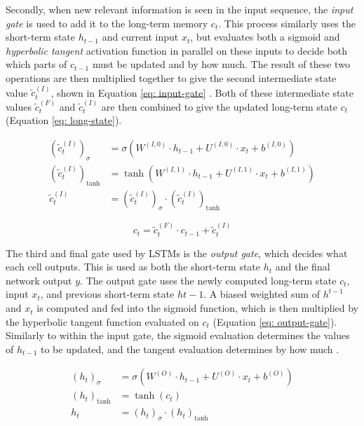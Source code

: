 \documentclass[a4paper, 11pt]{report}
\begin{document}
    Secondly, when new relevant information is seen in the input sequence, the \emph{input gate} is used to add it to the long-term memory $c_t$. This process similarly uses the short-term state $h_{t-1}$ and current input $x_t$, but evaluates both a sigmoid and \emph{hyperbolic tangent} activation function in parallel on these inputs to decide both which parts of $c_{t-1}$ must be updated and by how much. The result of these two operations are then multiplied together to give the second intermediate state value $\tilde{c}^{(I)}_t$, shown in Equation \ref{eq: input-gate} \citep{zhang-2021}. Both of these intermediate state values $\tilde{c}^{(F)}_t$ and $\tilde{c}^{(I)}_t$ are then combined to give the updated long-term state $c_t$ (Equation \ref{eq: long-state}).

    \begin{align}
        \label{eq: input-gate}
        (\tilde{c}^{(I)}_t)_{\sigma} &= \sigma( W^{(I,0)} \cdot h_{t-1} + U^{(I,0)} \cdot x_t + b^{(I,0)} ) \\
        (\tilde{c}^{(I)}_t)_{\tanh} &= \tanh{( W^{(I,1)} \cdot h_{t-1} + U^{(I,1)} \cdot x_t + b^{(I,1)} )} \\
        \tilde{c}^{(I)}_t &= (\tilde{c}^{(I)}_t)_{\sigma} \cdot (\tilde{c}^{(I)}_t)_{\tanh}
    \end{align}

    \begin{equation}
        \label{eq: long-state}
        c_t = \tilde{c}^{(F)}_t \cdot c_{t-1} + \tilde{c}^{(I)}_t
    \end{equation}

    The third and final gate used by LSTMs is the \emph{output gate}, which decides what each cell outputs. This is used as both the short-term state $h_t$ and the final network output $y$. The output gate uses the newly computed long-term state $c_t$, input $x_t$, and previous short-term state $h{t-1}$. A biased weighted sum of $h^{t-1}$ and $x_t$ is computed and fed into the sigmoid function, which is then multiplied by the hyperbolic tangent function evaluated on $c_t$ (Equation \ref{eq: output-gate}). Similarly to within the input gate, the sigmoid evaluation determines the values of $h_{t-1}$ to be updated, and the tangent evaluation determines by how much \citep{zhang-2021}.

    \begin{align}
        \label{eq: output-gate}
        (h_t)_{\sigma} &= \sigma( W^{(O)} \cdot h_{t-1} + U^{(O)} \cdot x_t + b^{(O)} ) \\
        (h_t)_{\tanh} &= \tanh{( c_t )} \\
        h_t &= (h_t)_{\sigma} \cdot (h_t)_{\tanh}
    \end{align}
\end{document}
